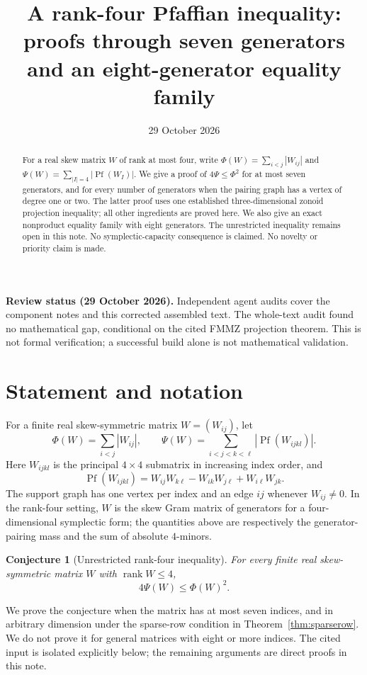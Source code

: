 \documentclass[11pt]{article}
\title{A rank-four Pfaffian inequality: proofs through seven generators and an eight-generator equality family}
\author{}
\date{29 October 2026}
\newtheorem{conjecture}[theorem]{Conjecture}
\newcommand{\pf}{\operatorname{Pf}}
\begin{document}
\maketitle
\noindent\textbf{Review status (29 October 2026).} Independent agent audits cover the component notes and this corrected assembled text. The whole-text audit found no mathematical gap, conditional on the cited FMMZ projection theorem. This is not formal verification; a successful build alone is not mathematical validation.


\begin{abstract}
For a real skew matrix $W$ of rank at most four, write $\Phi(W)=\sum_{i<j}|W_{ij}|$ and $\Psi(W)=\sum_{|I|=4}|\pf(W_I)|$. We give a proof of $4\Psi\leq\Phi^2$ for at most seven generators, and for every number of generators when the pairing graph has a vertex of degree one or two. The latter proof uses one established three-dimensional zonoid projection inequality; all other ingredients are proved here. We also give an exact nonproduct equality family with eight generators. The unrestricted inequality remains open in this note. No symplectic-capacity consequence is claimed. No novelty or priority claim is made.
\end{abstract}

\section{Statement and notation}
For a finite real skew-symmetric matrix $W=(W_{ij})$, let
\[
 \Phi(W)=\sum_{i<j}|W_{ij}|,\qquad
 \Psi(W)=\sum_{i<j<k<\ell}|\pf(W_{ijkl})|.
\]
Here $W_{ijkl}$ is the principal $4\times4$ submatrix in increasing index order, and
\[
 \pf(W_{ijkl})=W_{ij}W_{k\ell}-W_{ik}W_{j\ell}+W_{i\ell}W_{jk}.
\]
The support graph has one vertex per index and an edge $ij$ whenever $W_{ij}\ne0$. In the rank-four setting, $W$ is the skew Gram matrix of generators for a four-dimensional symplectic form; the quantities above are respectively the generator-pairing mass and the sum of absolute $4$-minors.

\begin{conjecture}[Unrestricted rank-four inequality]
For every finite real skew-symmetric matrix $W$ with $\operatorname{rank}W\leq4$,
\[
                         4\Psi(W)\leq\Phi(W)^2.
\]
\end{conjecture}

We prove the conjecture when the matrix has at most seven indices, and in arbitrary dimension under the sparse-row condition in Theorem~\ref{thm:sparserow}. We do not prove it for general matrices with eight or more indices. The cited input is isolated explicitly below; the remaining arguments are direct proofs in this note.
\end{document}
